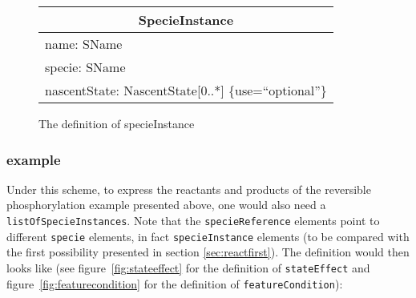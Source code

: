 \documentclass{cekarticle}
\begin{document}
\begin{figure}[h]
  \vspace*{8pt}
  \centering
  \textcolor{red}{%
  \begin{tabular}{|l|}
    \hline
    \multicolumn{1}{|c|}{\rule[-3mm]{0mm}{8mm}{\textsf{SpecieInstance}}}\\
    \hline
    \rule[0mm]{0mm}{5mm}{\textsf{\small name: SName }}\\
    \textsf{\small specie: SName } \\
    \rule[-3mm]{0mm}{5mm}{\textsf{\small nascentState: NascentState[0..*]  \{use=``optional''\}}}\\
    \hline
  \end{tabular}
}
  \caption{The definition of specieInstance}
  \label{fig:specieinstance}
\end{figure}

\subsubsection{example}

Under this scheme, to express the reactants and products of the reversible
phosphorylation example presented above, one would also need a
\texttt{listOfSpecieInstances}.  Note that the \texttt{specieReference} elements
point to different \texttt{specie} elements, in fact \texttt{specieInstance}
elements (to be compared with the first possibility presented in section
\ref{sec:reactfirst}). The definition would then looks like (see
figure~\ref{fig:stateeffect} for the definition of \texttt{stateEffect} and
figure~\ref{fig:featurecondition} for the definition of
\texttt{featureCondition}):
\end{document}
